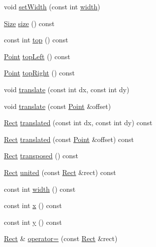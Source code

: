 \begin{DoxyCompactItemize}
\item 
void \hyperlink{classprism_1_1geometry_1_1_rect_a2b418c3a8bfa81d1dfcdff62f532f7f5}{set\+Width} (const int \hyperlink{classprism_1_1geometry_1_1_rect_afe228be73477fba4bb5865c23d2761f2}{width})
\item 
\hyperlink{classprism_1_1geometry_1_1_size}{Size} \hyperlink{classprism_1_1geometry_1_1_rect_a5f848db57909f09943fc21fd45a41da2}{size} () const 
\item 
const int \hyperlink{classprism_1_1geometry_1_1_rect_ae05c3819e7cbbe4e3438ed477b927251}{top} () const 
\item 
\hyperlink{classprism_1_1geometry_1_1_point}{Point} \hyperlink{classprism_1_1geometry_1_1_rect_ae1286050e3e1d841e065170e6fa213d2}{top\+Left} () const 
\item 
\hyperlink{classprism_1_1geometry_1_1_point}{Point} \hyperlink{classprism_1_1geometry_1_1_rect_a7220a37ad32137c12b1f1e29343f60bd}{top\+Right} () const 
\item 
void \hyperlink{classprism_1_1geometry_1_1_rect_a204cfa6f9844054c19845cd6fb70148c}{translate} (const int dx, const int dy)
\item 
void \hyperlink{classprism_1_1geometry_1_1_rect_a9cc62fffe094f07d175e97cd392dd69b}{translate} (const \hyperlink{classprism_1_1geometry_1_1_point}{Point} \&offset)
\item 
\hyperlink{classprism_1_1geometry_1_1_rect}{Rect} \hyperlink{classprism_1_1geometry_1_1_rect_a6705b147640d1170b3b8bd95b8291b86}{translated} (const int dx, const int dy) const 
\item 
\hyperlink{classprism_1_1geometry_1_1_rect}{Rect} \hyperlink{classprism_1_1geometry_1_1_rect_a6caba9800b45624e4e365e90ee3e1c76}{translated} (const \hyperlink{classprism_1_1geometry_1_1_point}{Point} \&offset) const 
\item 
\hyperlink{classprism_1_1geometry_1_1_rect}{Rect} \hyperlink{classprism_1_1geometry_1_1_rect_ac8f4756c021ee21a653433b91d9ec959}{transposed} () const 
\item 
\hyperlink{classprism_1_1geometry_1_1_rect}{Rect} \hyperlink{classprism_1_1geometry_1_1_rect_abf31fd9bcc26fa264dc91db7ec3f87bf}{united} (const \hyperlink{classprism_1_1geometry_1_1_rect}{Rect} \&rect) const 
\item 
const int \hyperlink{classprism_1_1geometry_1_1_rect_afe228be73477fba4bb5865c23d2761f2}{width} () const 
\item 
const int \hyperlink{classprism_1_1geometry_1_1_rect_a7ecf0e30c1485b8b6ed1c83625e0ce4c}{x} () const 
\item 
const int \hyperlink{classprism_1_1geometry_1_1_rect_aae87aa965538d7d9ba24050d111fbd0f}{y} () const 
\item 
\hyperlink{classprism_1_1geometry_1_1_rect}{Rect} \& \hyperlink{classprism_1_1geometry_1_1_rect_ab5ff8b854d944cf0dcaa7fed8321246e}{operator=} (const \hyperlink{classprism_1_1geometry_1_1_rect}{Rect} \&rect)
\end{DoxyCompactItemize}

